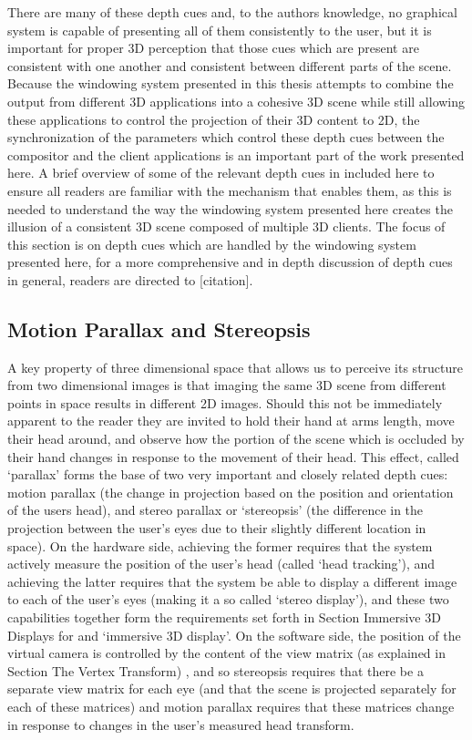 There are many of these depth cues and, to the authors knowledge, no graphical system is capable of presenting all of them consistently to the user, but it is important for proper 3D perception that those cues which are present are consistent with one another and consistent between different parts of the scene. Because the windowing system presented in this thesis attempts to combine the output from different 3D applications into a cohesive 3D scene while still allowing these applications to control the projection of their 3D content to 2D, the synchronization of the parameters which control these depth cues between the compositor and the client applications is an important part of the work presented here. A brief overview of some of the relevant depth cues in included here to ensure all readers are familiar with the mechanism that enables them, as this is needed to understand the way the windowing system presented here creates the illusion of a consistent 3D scene composed of multiple 3D clients. The focus of this section is on depth cues which are handled by the windowing system presented here, for a more comprehensive and in depth discussion of depth cues in general, readers are directed to [citation].

\subsection{Motion Parallax and Stereopsis}

A key property of three dimensional space that allows us to perceive its structure from two dimensional images is that imaging the same 3D scene from different points in space results in different 2D images. Should this not be immediately apparent to the reader they are invited to hold their hand at arms length, move their head around, and observe how the portion of the scene which is occluded by their hand changes in response to the movement of their head. This effect, called ‘parallax’ forms the base of two very important and closely related depth cues: motion parallax (the change in projection based on the position and orientation of the users head), and stereo parallax or ‘stereopsis’ (the difference in the projection between the user’s eyes due to their slightly different location in space). On the hardware side, achieving the former requires that the system actively measure the position of the user’s head (called ‘head tracking’), and achieving the latter requires that the system be able to display a different image to each of the user’s eyes (making it a so called ‘stereo display’), and these two capabilities together form the requirements set forth in Section {Immersive 3D Displays} for and ‘immersive 3D display’. On the software side, the position of the virtual camera is controlled by the content of the view matrix (as explained in Section {The Vertex Transform}) , and so stereopsis requires that there be a separate view matrix for each eye (and that the scene is projected separately for each of these matrices) and motion parallax requires that these matrices change in response to changes in the user’s measured head transform.

